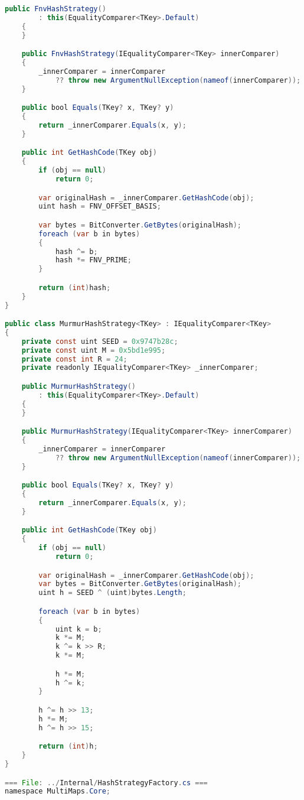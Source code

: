 \documentclass[12pt]{article}
\begin{document}
\begin{lstlisting}[language=Java]
    public FnvHashStrategy()
        : this(EqualityComparer<TKey>.Default)
    {
    }

    public FnvHashStrategy(IEqualityComparer<TKey> innerComparer)
    {
        _innerComparer = innerComparer
            ?? throw new ArgumentNullException(nameof(innerComparer));
    }

    public bool Equals(TKey? x, TKey? y)
    {
        return _innerComparer.Equals(x, y);
    }

    public int GetHashCode(TKey obj)
    {
        if (obj == null)
            return 0;

        var originalHash = _innerComparer.GetHashCode(obj);
        uint hash = FNV_OFFSET_BASIS;

        var bytes = BitConverter.GetBytes(originalHash);
        foreach (var b in bytes)
        {
            hash ^= b;
            hash *= FNV_PRIME;
        }

        return (int)hash;
    }
}

public class MurmurHashStrategy<TKey> : IEqualityComparer<TKey>
{
    private const uint SEED = 0x9747b28c;
    private const uint M = 0x5bd1e995;
    private const int R = 24;
    private readonly IEqualityComparer<TKey> _innerComparer;

    public MurmurHashStrategy()
        : this(EqualityComparer<TKey>.Default)
    {
    }

    public MurmurHashStrategy(IEqualityComparer<TKey> innerComparer)
    {
        _innerComparer = innerComparer
            ?? throw new ArgumentNullException(nameof(innerComparer));
    }

    public bool Equals(TKey? x, TKey? y)
    {
        return _innerComparer.Equals(x, y);
    }

    public int GetHashCode(TKey obj)
    {
        if (obj == null)
            return 0;

        var originalHash = _innerComparer.GetHashCode(obj);
        var bytes = BitConverter.GetBytes(originalHash);
        uint h = SEED ^ (uint)bytes.Length;

        foreach (var b in bytes)
        {
            uint k = b;
            k *= M;
            k ^= k >> R;
            k *= M;

            h *= M;
            h ^= k;
        }

        h ^= h >> 13;
        h *= M;
        h ^= h >> 15;

        return (int)h;
    }
}

=== File: ../Internal/HashStrategyFactory.cs ===
namespace MultiMaps.Core;


\end{lstlisting}
\end{document}
